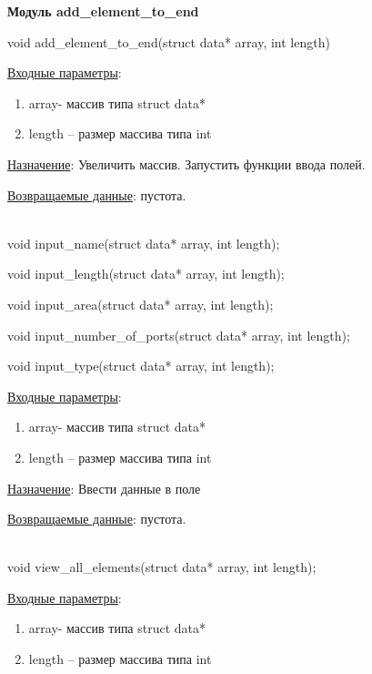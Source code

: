 \textbf{Модуль add\_element\_to\_end}

void add\_element\_to\_end(struct data* array, int length)

\underline{Входные параметры}:

\begin{enumerate}
    \item array- массив типа struct data*
    \item length – размер массива типа int
\end{enumerate}

\underline{Назначение}: Увеличить массив. Запустить функции ввода полей.

\underline{Возвращаемые данные}: пустота.

\hspace{0pt}\\



void input\_name(struct data* array, int length);

void input\_length(struct data* array, int length);

void input\_area(struct data* array, int length);

void input\_number\_of\_ports(struct data* array, int length);

void input\_type(struct data* array, int length);

\underline{Входные параметры}:

\begin{enumerate}
    \item array- массив типа struct data*
    \item length – размер массива типа int
\end{enumerate}

\underline{Назначение}: Ввести данные в поле

\underline{Возвращаемые данные}: пустота.

\hspace{0pt}\\



void view\_all\_elements(struct data* array, int length);

\underline{Входные параметры}:

\begin{enumerate}
    \item array- массив типа struct data*
    \item length – размер массива типа int
\end{enumerate}

